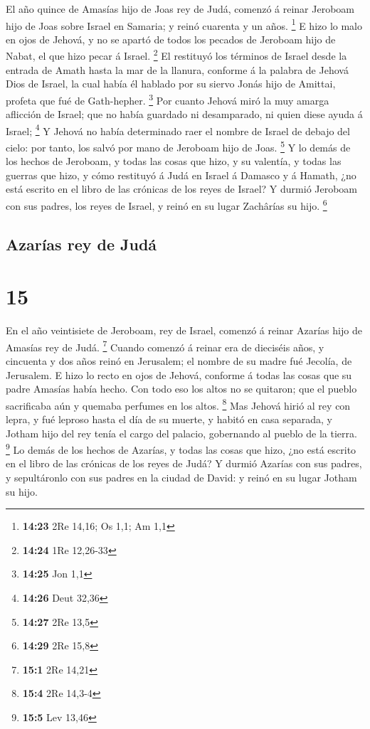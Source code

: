  El año quince de Amasías hijo de Joas rey de Judá,
comenzó á reinar Jeroboam hijo de Joas sobre Israel en Samaria; y reinó
cuarenta y un años. \footnote{\textbf{14:23} 2Re 14,16; Os 1,1; Am 1,1}
 E hizo lo malo en ojos de Jehová, y no se apartó de
todos los pecados de Jeroboam hijo de Nabat, el que hizo pecar á Israel.
\footnote{\textbf{14:24} 1Re 12,26-33}  El restituyó los
términos de Israel desde la entrada de Amath hasta la mar de la llanura,
conforme á la palabra de Jehová Dios de Israel, la cual había él hablado
por su siervo Jonás hijo de Amittai, profeta que fué de Gath-hepher.
\footnote{\textbf{14:25} Jon 1,1}  Por cuanto Jehová miró
la muy amarga aflicción de Israel; que no había guardado ni desamparado,
ni quien diese ayuda á Israel; \footnote{\textbf{14:26} Deut 32,36}
 Y Jehová no había determinado raer el nombre de Israel
de debajo del cielo: por tanto, los salvó por mano de Jeroboam hijo de
Joas. \footnote{\textbf{14:27} 2Re 13,5}  Y lo demás de
los hechos de Jeroboam, y todas las cosas que hizo, y su valentía, y
todas las guerras que hizo, y cómo restituyó á Judá en Israel á Damasco
y á Hamath, ¿no está escrito en el libro de las crónicas de los reyes de
Israel?  Y durmió Jeroboam con sus padres, los reyes de
Israel, y reinó en su lugar Zachârías su hijo. \footnote{\textbf{14:29}
  2Re 15,8}

\hypertarget{azaruxedas-rey-de-juduxe1}{%
\subsection{Azarías rey de Judá}\label{azaruxedas-rey-de-juduxe1}}

\hypertarget{section-14}{%
\section{15}\label{section-14}}

 En el año veintisiete de Jeroboam, rey de Israel, comenzó
á reinar Azarías hijo de Amasías rey de Judá. \footnote{\textbf{15:1}
  2Re 14,21}  Cuando comenzó á reinar era de dieciséis
años, y cincuenta y dos años reinó en Jerusalem; el nombre de su madre
fué Jecolía, de Jerusalem.  E hizo lo recto en ojos de
Jehová, conforme á todas las cosas que su padre Amasías había hecho.
 Con todo eso los altos no se quitaron; que el pueblo
sacrificaba aún y quemaba perfumes en los altos. \footnote{\textbf{15:4}
  2Re 14,3-4}  Mas Jehová hirió al rey con lepra, y fué
leproso hasta el día de su muerte, y habitó en casa separada, y Jotham
hijo del rey tenía el cargo del palacio, gobernando al pueblo de la
tierra. \footnote{\textbf{15:5} Lev 13,46}  Lo demás de
los hechos de Azarías, y todas las cosas que hizo, ¿no está escrito en
el libro de las crónicas de los reyes de Judá?  Y durmió
Azarías con sus padres, y sepultáronlo con sus padres en la ciudad de
David: y reinó en su lugar Jotham su hijo.

